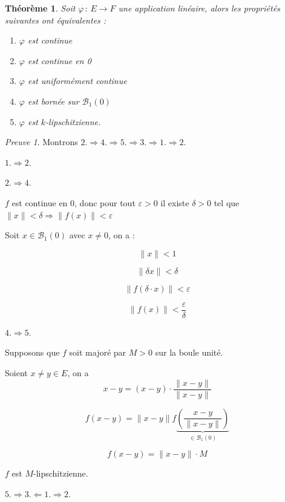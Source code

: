 \documentclass[]{article}
\newtheorem{mythm}{Théorème}
\theoremstyle{remark}
\newtheorem{myproof}{Preuve}
\theoremstyle{definition}
\newcommand{\funcshort}[3]{
#1 \, : \, #2 \longrightarrow #3
}
\newenvironment{proofpart}[1]{
	\noindent
	{\textbf{\boldmath #1}}
}{
	\checkmark
}
\begin{document}
\begin{mythm}
	Soit $\funcshort{\varphi}{E}{F}$ une application linéaire, alors les propriétés suivantes ont équivalentes :
	
	\begin{enumerate}
		\item $\varphi$ est continue
		\item $\varphi$ est continue en 0
		\item $\varphi$ est uniformément continue
		\item $\varphi$ est bornée sur $\mathcal{B}_1(0)$
		\item $\varphi$ est $k$-lipschitzienne.
	\end{enumerate}
\end{mythm}


\begin{myproof}
	Montrons $2. \Longrightarrow 4. \Longrightarrow 5. \Longrightarrow 3.\Longrightarrow 1. \Longrightarrow 2.$
	
	\begin{proofpart}{$1. \Longrightarrow 2.$}
	\end{proofpart}
	
	\begin{proofpart}{$2. \Longrightarrow 4.$}
		$f$ est continue en 0, donc pour tout $\varepsilon > 0$ il existe $\delta > 0$ tel que $\|x\| < \delta \Longrightarrow \|f(x)\| < \varepsilon$
		
		Soit $x \in \mathcal{B}_1(0)$ avec $x \neq 0$, on a :
		
		$$\|x\| < 1$$

		$$\|\delta x\| < \delta$$
		
		$$\|f(\delta \cdot x)\| < \varepsilon$$
		
		$$\|f(x)\| < \frac{\varepsilon}{\delta}$$
	\end{proofpart}
	
	\begin{proofpart}{$4. \Longrightarrow 5.$}
		Supposons que $f$ soit majoré par $M > 0$ sur la boule unité.
		
		Soient $x \neq y \in E$, on a
		$$x-y = (x-y) \cdot \frac{\|x-y\|}{\|x-y\|}$$
		
		$$f(x-y) = \|x-y\| f\underbrace{\left(\frac{x-y}{\|x-y\|}\right)}_{\in \mathcal{B}_1(0)}$$
		
		$$f(x-y) = \|x-y\| \cdot M$$
		
		$f$ est $M$-lipschitzienne.
	\end{proofpart}
	
	\begin{proofpart}{$5. \Longrightarrow 3. \Longleftarrow 1. \Longrightarrow 2.$}
	\end{proofpart}
\end{myproof}
\end{document}
